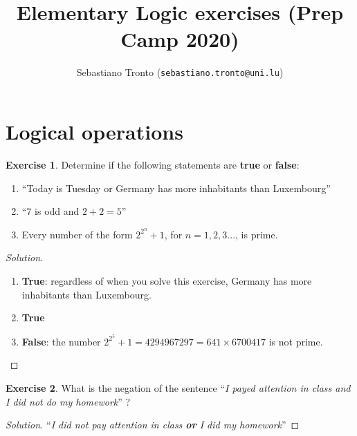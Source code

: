 \documentclass[a4paper,oneside]{article}
\author{Sebastiano Tronto (\texttt{sebastiano.tronto@uni.lu})}
\title{Elementary Logic exercises (Prep Camp 2020)}
\theoremstyle{definition} \newtheorem{exercise}{Exercise}[section]
\begin{document}
\maketitle

\section{Logical operations}

\begin{exercise}
  Determine if the following statements are \textbf{true} or \textbf{false}:
  \begin{enumerate}
    \item ``Today is Tuesday or Germany has more inhabitants than Luxembourg''
    \item ``$7$ is odd and $2+2=5$''
    \item Every number of the form $2^{2^n}+1$, for $n=1,2,3...$, is prime.
  \end{enumerate}
\end{exercise}
\begin{proof}[Solution]
  \begin{enumerate}
    \item \textbf{True}: regardless of when you solve this exercise, Germany
          has more inhabitants than Luxembourg.
    \item \textbf{True}
    \item \textbf{False}: the number $2^{2^5}+1=4294967297=641\times 6700417$
          is not prime.
  \end{enumerate}
\end{proof}

\begin{exercise}
  What is the negation of the sentence ``\emph{I payed attention in class and I
  did not do my homework}'' ?
\end{exercise}
\begin{proof}[Solution]
  ``\emph{I did not pay attention in class \textbf{or} I did my homework}''
\end{proof}
\end{document}
